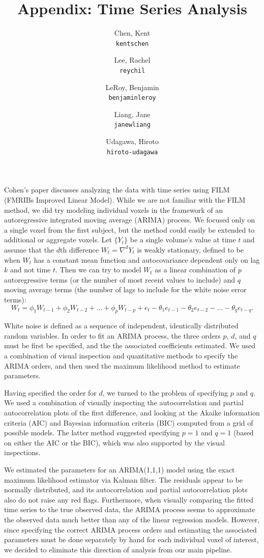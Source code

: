 \documentclass[11pt]{article}
\title{Appendix: Time Series Analysis}
\author{
  Chen, Kent\\
  \texttt{kentschen}
  \and
  Lee, Rachel\\
  \texttt{reychil}
  \and
  LeRoy, Benjamin\\
  \texttt{benjaminleroy}
  \and
  Liang, Jane\\
  \texttt{janewliang}
  \and
  Udagawa, Hiroto\\
  \texttt{hiroto-udagawa}
}
\begin{document}
\maketitle

\par \indent Cohen's paper \cite{CohenSelfControl} discusses analyzing the 
data with time series using FILM (FMRIBs Improved Linear Model). While we are 
not familiar with the FILM method, we did try modeling individual voxels in 
the framework of an autoregressive integrated moving average (ARIMA) process. 
We focused only on a single voxel from the first subject, but the method 
could easily be extended to additional or aggregate voxels. Let $\{Y_t\}$ be 
a single volume's value at time $t$ and assume that the $d$th difference 
$W_t = \nabla^d Y_t$ is weakly stationary, defined to be when $W_t$ has a 
constant mean function and autocovariance dependent only on lag $k$ and not 
time $t$. Then we can try to model $W_t$ as a linear combination of $p$ 
autoregressive terms (or the number of most recent values to include) and $q$ 
moving average terms (the number of lags to include for the white noise error 
terms): 
$$W_t = \phi_1 W_{t-1} + \phi_2 W_{t-2} + ... + \phi_p W_{t-p} + e_t - 
\theta_1 e_{t-1} - \theta_2 e_{t-2} - ... - \theta_q e_{t-q}.$$

\par White noise is defined as a sequence of independent, identically 
distributed random variables. In order to fit an ARIMA process, the three 
orders $p$, $d$, and $q$ must be first be specified, and the the associated 
coefficients estimated. We used a combination of visual inspection and 
quantitative methods to specify the ARIMA orders, and then used the maximum 
likelihood method to estimate parameters. 

\par Having specified the order for $d$, we turned to the problem of 
specifying $p$ and $q$. We used a combination of visually inspecting the 
autocorrelation and partial autocorrelation plots of the first difference, 
and looking at the Akaike information criteria (AIC) and Bayesian information 
criteria (BIC) computed from a grid of possible models. The latter method 
suggested specifying $p=1$ and $q=1$ (based on either the AIC or the BIC), 
which was also supported by the visual inspections. 

\par We estimated the parameters for an ARIMA(1,1,1) model using the exact 
maximum likelihood estimator via Kalman filter. The residuals appear to be 
normally distributed, and its autocorrelation and partial autocorrelation 
plots also do not raise any red flags. Furthermore, when visually comparing 
the fitted time series to the true observed data, the ARIMA process seems to 
approximate the observed data much better than any of the linear regression 
models. However, since specifying the correct ARIMA process orders and 
estimating the associated parameters must be done separately by hand for 
each individual voxel of interest, we decided to eliminate this direction 
of analysis from our main pipeline. 
\end{document}
